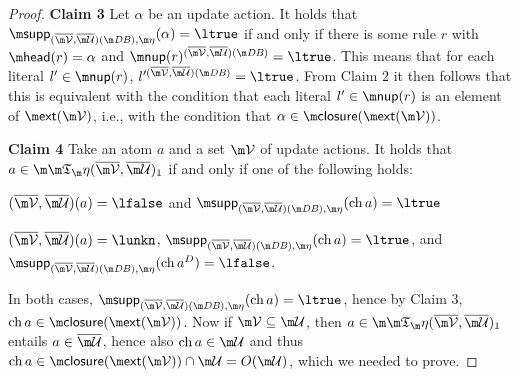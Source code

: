 {\begin{proof}
\textbf{Claim 3} 
Let $\alpha$ be an update action. 
It holds that  $\supp_{(\overline\VV,\overline\UU)(\db),\aics}(\alpha) = \ltrue$ if and only if there is some rule $r$ with $\head(r)=\alpha$ and $\nup(r)^{ (\overline\VV, \overline\UU)(\db)} = \ltrue$. This means that for each literal $l'\in \nup(r)$, $l'^{(\overline\VV, \overline\UU)(\db)} = \ltrue$. From Claim 2 it then follows that this is equivalent with the condition that each literal $l'\in\nup(r)$ is an element of   $\ext(\VV)$, i.e., with  the condition that $\alpha \in \closure(\ext(\VV))$. 


\textbf{Claim 4}
Take an atom $a$ and a set $\VV$ of update actions. It holds that $a\in \Ap(\overline\VV,\overline\UU)_1$ if and only if one of the following holds:
\begin{compactitem}
 \item $(\overline \VV,\overline \UU)(a) = \lfalse$ and $\supp_{(\overline\VV,\overline\UU)(\db),\aics}(\change a)=\ltrue$
 \item $(\overline \VV,\overline \UU)(a) = \lunkn$, $ \supp_{(\overline\VV,\overline\UU)(\db),\aics}(\change a)=\ltrue$, and $\supp_{(\overline\VV,\overline\UU)(\db),\aics}(\change a^D) = \lfalse$.
\end{compactitem}
In both cases, $\supp_{(\overline\VV,\overline\UU)(\db),\aics}(\change a)=\ltrue$, hence by Claim 3, $\change a\in \closure(\ext(\VV))$. Now if $\VV\subseteq \UU$, then $a\in\Ap(\overline\VV,\overline\UU)_1$ entails $a\in \overline\UU$, hence also $\change a \in \UU$ and thus $\change a \in \closure(\ext(\VV)) \cap \UU = O(\UU)$, which we needed to prove. \qedhere





\end{proof}}
